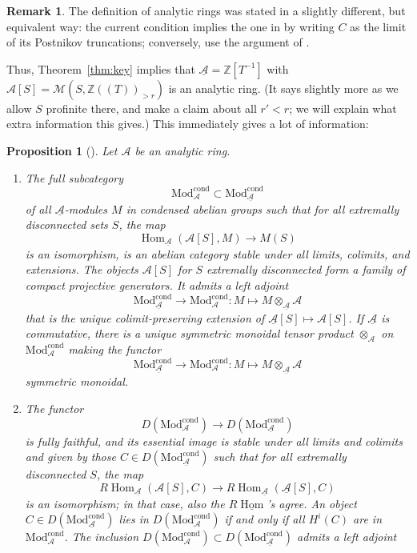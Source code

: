 \documentclass[11pt]{amsbook}
\DeclareMathOperator{\Hom}{Hom}
\newcommand{\intHom}{\underline{\Hom}}
\newcommand{\CondMod}{\mathrm{Mod}^{\mathrm{cond}}}
\numberwithin{equation}{section}
\numberwithin{theorem}{section}
\newtheorem{proposition}[theorem]{Proposition}
\theoremstyle{definition}
\newtheorem{remark}[theorem]{Remark}
\begin{document}
\begin{remark} The definition of analytic rings was stated in a slightly different, but equivalent way: the current condition implies the one in \cite[Definition 7.4]{Condensed} by writing $C$ as the limit of its Postnikov truncations; conversely, use the argument of \cite[Lemma 5.10]{Condensed}.
\end{remark}

Thus, Theorem~\ref{thm:key} implies that $\underline{\mathcal A}=\mathbb Z[T^{-1}]$ with $\mathcal A[S]=\mathcal M(S,\mathbb Z((T))_{>r})$ is an analytic ring. (It says slightly more as we allow $S$ profinite there, and make a claim about all $r'<r$; we will explain what extra information this gives.) This immediately gives a lot of information:

\begin{proposition}[{\cite[Proposition 7.5]{Condensed}}] Let $\mathcal A$ be an analytic ring.
\begin{enumerate}
\item[{\rm (i)}] The full subcategory
\[
\CondMod_{\mathcal A}\subset \CondMod_{\underline{\mathcal A}}
\]
of all $\underline{\mathcal A}$-modules $M$ in condensed abelian groups such that for all extremally disconnected sets $S$, the map
\[
\Hom_{\underline{\mathcal A}}(\mathcal A[S],M)\to M(S)
\]
is an isomorphism, is an abelian category stable under all limits, colimits, and extensions. The objects $\mathcal A[S]$ for $S$ extremally disconnected form a family of compact projective generators. It admits a left adjoint
\[
\CondMod_{\underline{\mathcal A}}\to \CondMod_{\mathcal A}: M\mapsto M\otimes_{\underline{\mathcal A}} \mathcal A
\]
that is the unique colimit-preserving extension of $\underline{\mathcal A}[S]\mapsto \mathcal A[S]$. If $\underline{\mathcal A}$ is commutative, there is a unique symmetric monoidal tensor product $\otimes_{\mathcal A}$ on $\CondMod_{\mathcal A}$ making the functor
\[
\CondMod_{\underline{\mathcal A}}\to \CondMod_{\mathcal A}: M\mapsto M\otimes_{\underline{\mathcal A}} \mathcal A
\]
symmetric monoidal.
\item[{\rm (ii)}] The functor
\[
D(\CondMod_{\mathcal A})\to D(\CondMod_{\underline{\mathcal A}})
\]
is fully faithful, and its essential image is stable under all limits and colimits and given by those $C\in D(\CondMod_{\underline{\mathcal A}})$ such that for all extremally disconnected $S$, the map
\[
R\Hom_{\underline{\mathcal A}}(\mathcal A[S],C)\to R\Hom_{\underline{\mathcal A}}(\underline{\mathcal A}[S],C)
\]
is an isomorphism; in that case, also the $R\intHom$'s agree. An object $C\in D(\CondMod_{\underline{\mathcal A}})$ lies in $D(\CondMod_{\mathcal A})$ if and only if all $H^i(C)$ are in $\CondMod_{\mathcal A}$. The inclusion $D(\CondMod_{\mathcal A})\subset D(\CondMod_{\underline{\mathcal A}})$ admits a left adjoint

\end{enumerate}
\end{proposition}
\end{document}

